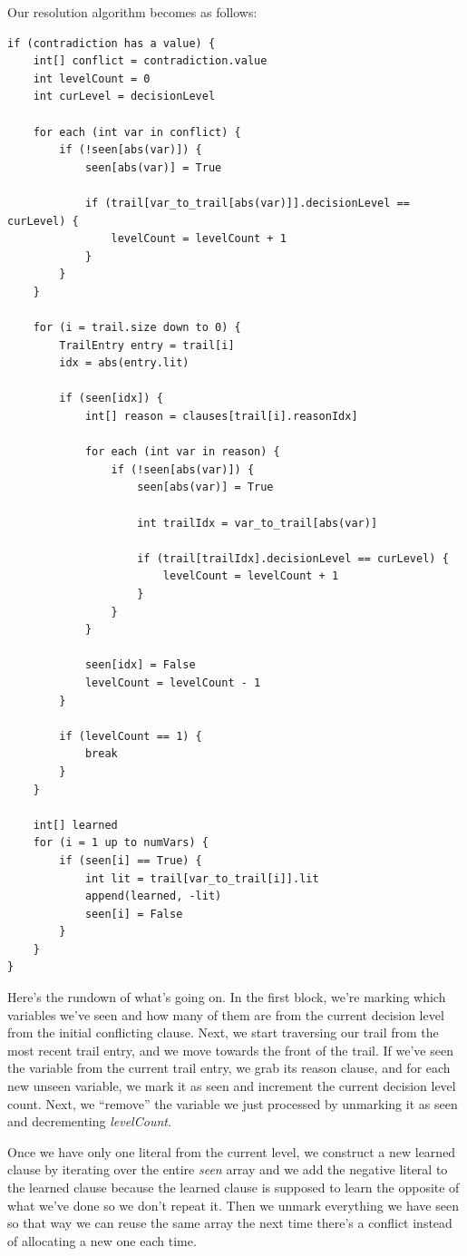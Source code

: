 \documentclass[oneside]{book}
\begin{document}
Our resolution algorithm becomes as follows:
\begin{lstlisting}
if (contradiction has a value) {
    int[] conflict = contradiction.value
    int levelCount = 0
    int curLevel = decisionLevel

    for each (int var in conflict) {
        if (!seen[abs(var)]) {
            seen[abs(var)] = True 

            if (trail[var_to_trail[abs(var)]].decisionLevel == curLevel) {
                levelCount = levelCount + 1
            }
        }
    }

    for (i = trail.size down to 0) {
        TrailEntry entry = trail[i]
        idx = abs(entry.lit)

        if (seen[idx]) {
            int[] reason = clauses[trail[i].reasonIdx]

            for each (int var in reason) {
                if (!seen[abs(var)]) {
                    seen[abs(var)] = True 

                    int trailIdx = var_to_trail[abs(var)]

                    if (trail[trailIdx].decisionLevel == curLevel) {
                        levelCount = levelCount + 1
                    }
                }
            }

            seen[idx] = False
            levelCount = levelCount - 1
        }

        if (levelCount == 1) {
            break
        }
    }

    int[] learned
    for (i = 1 up to numVars) {
        if (seen[i] == True) {
            int lit = trail[var_to_trail[i]].lit
            append(learned, -lit)
            seen[i] = False
        }
    }
}
\end{lstlisting}
\noindent
Here's the rundown of what's going on. In the first block, we're marking which 
variables we've seen and how many of them are from the current decision level from 
the initial conflicting clause. Next, we start traversing our trail from the most recent 
trail entry, and we move towards the front of the trail. If we've seen the variable from 
the current trail entry, we grab its reason clause, and for each new unseen variable, 
we mark it as seen and increment the current decision level count. Next, we ``remove''
the variable we just processed by unmarking it as seen and decrementing \textit{levelCount}.

Once we have only one literal from the current level, we construct a new learned clause 
by iterating over the entire \textit{seen} array and we add the negative literal to the 
learned clause because the learned clause is supposed to learn the opposite of what we've 
done so we don't repeat it. Then we unmark everything we have seen so that way we can reuse 
the same array the next time there's a conflict instead of allocating a new one each time. 
\end{document}
